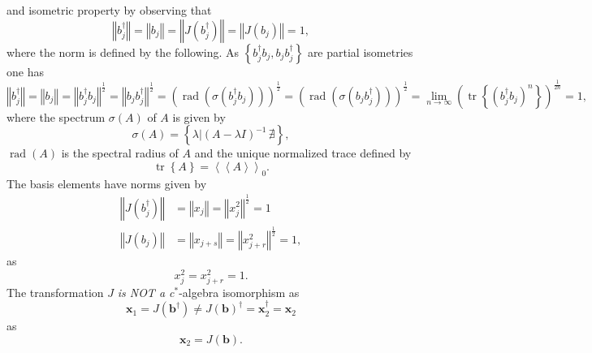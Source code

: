 \documentclass[aps,preprint]{revtex4}%
\begin{document}
and isometric property by observing that
\begin{equation}
\left\Vert b_{j}^{\dagger}\right\Vert =\left\Vert b_{j}\right\Vert =\left\Vert
J\left(  b_{j}^{\dagger}\right)  \right\Vert =\left\Vert J\left(
b_{j}\right)  \right\Vert =1,
\end{equation}
where the norm is defined by the following. As $\left\{  b_{j}^{\dagger}%
b_{j},b_{j}b_{j}^{\dagger}\right\}  $ are partial isometries one has
\begin{equation}
\left\Vert b_{j}^{\dagger}\right\Vert =\left\Vert b_{j}\right\Vert =\left\Vert
b_{j}^{\dagger}b_{j}\right\Vert ^{\frac{1}{2}}=\left\Vert b_{j}b_{j}^{\dagger
}\right\Vert ^{\frac{1}{2}}=\left(  \operatorname*{rad}\left(  \sigma\left(
b_{j}^{\dagger}b_{j}\right)  \right)  \right)  ^{\frac{1}{2}}=\left(
\operatorname*{rad}\left(  \sigma\left(  b_{j}b_{j}^{\dagger}\right)  \right)
\right)  ^{\frac{1}{2}}=\lim\limits_{n\rightarrow\infty}\left(
\operatorname*{tr}\left\{  \left(  b_{j}^{\dagger}b_{j}\right)  ^{n}\right\}
\right)  ^{\frac{1}{2n}}=1,
\end{equation}
where the spectrum $\sigma\left(  A\right)  $ of $A$ is given by
\begin{equation}
\sigma\left(  A\right)  =\left\{  \left.  \lambda\right\vert \left(  A-\lambda
I\right)  ^{-1}\,\nexists\right\}  ,
\end{equation}
$\operatorname*{rad}\left(  A\right)  $ is the spectral radius of $A$ and the
unique normalized trace defined by
\begin{equation}
\operatorname*{tr}\left\{  A\right\}  =\left\langle \left\langle
A\right\rangle \right\rangle _{0}.
\end{equation}
The basis elements have norms given by
\begin{align}
\left\Vert J\left(  b_{j}^{\dagger}\right)  \right\Vert  &  =\left\Vert
x_{j}\right\Vert =\left\Vert x_{j}^{2}\right\Vert ^{\frac{1}{2}}=1\\
\left\Vert J\left(  b_{j}\right)  \right\Vert  &  =\left\Vert x_{j+s}%
\right\Vert =\left\Vert x_{j+r}^{2}\right\Vert ^{\frac{1}{2}}=1,
\end{align}
as
\begin{equation}
x_{j}^{2}=x_{j+r}^{2}=1.
\end{equation}
The transformation\emph{ }$J$ \emph{is NOT a c}$^{\ast}$-algebra isomorphism
as
\begin{equation}
\mathbf{x}_{1}=J\left(  \mathbf{b}^{\dagger}\right)  \neq J\left(
\mathbf{b}\right)  ^{\dagger}=\mathbf{x}_{2}^{\dagger}=\mathbf{x}_{2}%
\end{equation}
as%
\begin{equation}
\mathbf{x}_{2}=J\left(  \mathbf{b}\right)  .
\end{equation}
\end{document}
